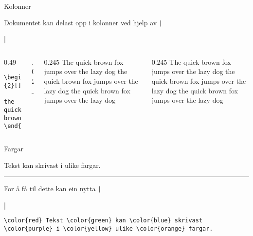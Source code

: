\begin{frame}[containsverbatim]{Kolonner}
	
	Dokumentet kan delast opp i kolonner ved hjelp av \texttt|\usepackage{multicol}|
	
	\begin{columns}
		\begin{column}{0.49\textwidth}
			
			\begin{verbatim}
\begin{multicols}{2}[]
	the quick brown...
\end{multicols}
			\end{verbatim}
			
		\end{column}
		\begin{column}{.02\textwidth}
			\rule{.1mm}{0.7\textheight}
		\end{column}
		\begin{column}{0.245\textwidth}
			The quick brown fox jumps over the lazy dog the quick brown fox jumps over the lazy dog	the quick brown fox jumps over the lazy dog
		\end{column}
		\begin{column}{0.245\textwidth}
			The quick brown fox jumps over the lazy dog	the quick brown fox jumps over the lazy dog the quick brown fox jumps over the lazy dog
		\end{column}
	\end{columns}
	
	
	
\end{frame}

\begin{frame}[containsverbatim]{Fargar}
	
	
	\color{red} Tekst \color{green} kan \color{blue} skrivast \color{purple} i \color{yellow} ulike \color{orange} fargar.
	
	{\color{red} \rule{\linewidth}{0.5mm}}
	
	\color{black}
	
	For å få til dette kan ein nytta \texttt|\usepackage{xcolor}|
	
	\begin{verbatim}
\color{red} Tekst \color{green} kan \color{blue} skrivast \color{purple} i \color{yellow} ulike \color{orange} fargar.
	\end{verbatim}
	
\end{frame}

